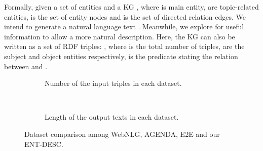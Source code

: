 \documentclass[11pt,a4paper]{article}
\begin{document}
Formally, given a set of entities  and a KG , where  is main entity,  are topic-related entities,  is the set of entity nodes and  is the set of directed relation edges.
We intend to generate a natural language text .
Meanwhile, we explore  for useful information to allow a more natural description. Here, the KG  can also be written as a set of RDF triples: , where  is the total number of triples,  are the subject and object entities respectively,  is the predicate stating the relation between  and .

\begin{table}[!t]
\centering
{}
\caption{Dataset statistics of WebNLG, AGENDA and our prepared ENT-DESC. 
\label{tb:stats_ds}}
\end{table}





\begin{figure*}[!t]
    \centering
    \begin{subfigure}[t]{0.5\textwidth}
        \centering
        \caption{Number of the input triples in each dataset.}
    \end{subfigure}~ 
    \begin{subfigure}[t]{0.5\textwidth}
        \centering
        \caption{Length of the output texts in each dataset.}
    \end{subfigure}
\caption{Dataset comparison among WebNLG, AGENDA, E2E and our ENT-DESC.}
\label{fig:dataset_compa}
\end{figure*}
\end{document}
